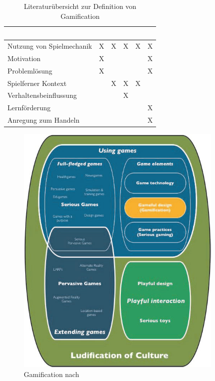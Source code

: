 \begin{table}
\footnotesize
\begin{tabular}{|l|l|l|l|l|l|}
\hline
~ & \textcite{Zichermann.2011} & \textcite{Deterding.2011} & \textcite{Breuer.2011} & \textcite{Oxford.2013} & \textcite{Kapp.2012} \\
\hline\hline 
Nutzung von Spielmechanik & X & X & X & X & X \\
\hline
Motivation & X & ~ & ~ & ~ & X \\
\hline
Problemlösung & X & ~ & ~ & ~ & X \\
\hline
Spielferner Kontext & ~ & X & X & X & ~ \\
\hline
Verhaltensbeinflussung & ~ & ~ & X & ~ & ~ \\
\hline
Lernförderung & ~ & ~ & ~ & ~ & X \\
\hline
Anregung zum Handeln & ~ & ~ & ~ & ~ & X \\
\hline
\end{tabular}
\label{table:ch3:lit_overview}
\caption{Literaturübersicht zur Definition von Gamification}
\end{table}



\begin{figure}[H]
\begin{center}
\includegraphics[width=100mm]{images/ch3_img02_gamification.png}
\caption{Gamification nach \textcite{Deterding.2011}}
\label{img:ch3_img02_gamification}
\end{center}
\end{figure}

